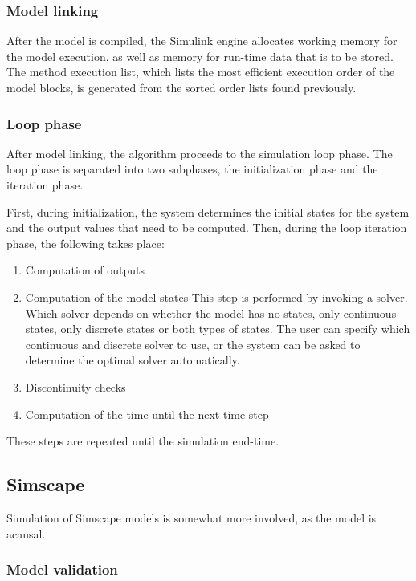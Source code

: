 \documentclass[\rootfolder/main.tex]{subfiles}
\begin{document}
\subsubsection{Model linking}

After the model is compiled, the Simulink engine allocates working memory for the model execution, as well as memory for run-time data that is to be stored.
The method execution list, which lists the most efficient execution order of the model blocks, is generated from the sorted order lists found previously.

\subsubsection{Loop phase}

After model linking, the algorithm proceeds to the simulation loop phase.
The loop phase is separated into two subphases, the initialization phase and the iteration phase.

First, during initialization, the system determines the initial states for the system and the output values that need to be computed.
Then, during the loop iteration phase, the following takes place:

\begin{enumerate}
    \item Computation of outputs
    \item Computation of the model states
        This step is performed by invoking a solver.
        Which solver depends on whether the model has no states, only continuous states, only discrete states or both types of states.
        The user can specify which continuous and discrete solver to use, or the system can be asked to determine the optimal solver automatically.
    \item Discontinuity checks
    \item Computation of the time until the next time step
\end{enumerate}

These steps are repeated until the simulation end-time.

\subsection{Simscape}

Simulation of Simscape models is somewhat more involved, as the model is acausal.

\subsubsection{Model validation}
\end{document}
